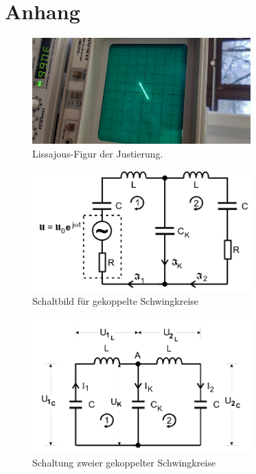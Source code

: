 \pagebreak
\section{Anhang}
\label{sec:anhang}

\begin{figure}
    \centering
    \includegraphics[width=0.75\textwidth, angle=-90]{plots/Lissajour-Gerade.jpeg}
    \caption{Lissajous-Figur der Justierung.}
    \label{fig:Lissajous}
\end{figure}

\begin{figure}
    \centering
    \includegraphics[width=0.75\textwidth]{plots/Schaltung3.png}
    \caption{Schaltbild für gekoppelte Schwingkreise \cite{v355}}
    \label{fig:schaltung3}
\end{figure}


\begin{figure}
    \centering
    \includegraphics[width=0.75\textwidth]{plots/Schaltung2.png}
    \caption{Schaltung zweier gekoppelter Schwingkreise \cite{v355}}
    \label{fig:schaltung2}
\end{figure}


